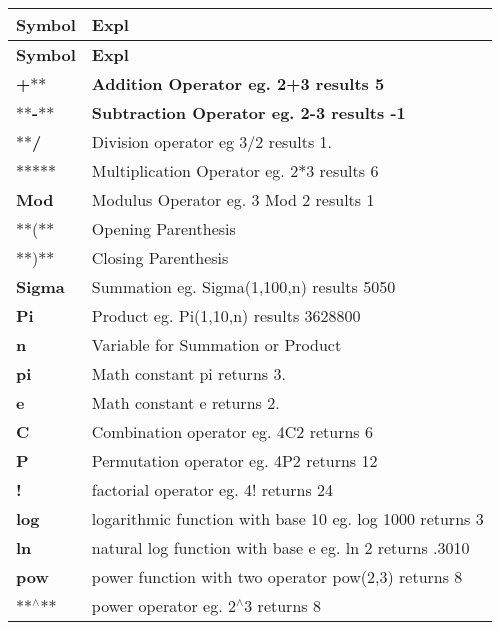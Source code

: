\tabulinesep=1mm
\begin{longtabu} spread 0pt [c]{*{2}{|X[-1]}|}
\hline
\rowcolor{\tableheadbgcolor}\textbf{ Symbol  }&\textbf{ Expl   }\\
\endfirsthead
\hline
\endfoot
\hline
\rowcolor{\tableheadbgcolor}\textbf{ Symbol  }&\textbf{ Expl   }\\
\endhead
{\bfseries +$\ast$$\ast$  }&{\bfseries  Addition Operator eg. 2+3 results 5   }\\
{\bfseries  $\ast$$\ast$-\/$\ast$$\ast$  }&{\bfseries  Subtraction Operator eg. 2-\/3 results -\/1   }\\
{\bfseries  $\ast$$\ast$/}  &Division operator eg 3/2 results 1.   \\
$\ast$$\ast$$\ast$$\ast$$\ast$  &Multiplication Operator eg. 2$\ast$3 results 6   \\
{\bfseries Mod}  &Modulus Operator eg. 3 Mod 2 results 1   \\
$\ast$$\ast$($\ast$$\ast$  &Opening Parenthesis   \\
$\ast$$\ast$)$\ast$$\ast$  &Closing Parenthesis   \\
{\bfseries Sigma}  &Summation eg. Sigma(1,100,n) results 5050   \\
{\bfseries Pi}  &Product eg. Pi(1,10,n) results 3628800   \\
{\bfseries n}  &Variable for Summation or Product   \\
{\bfseries pi}  &Math constant pi returns 3.   \\
{\bfseries e}  &Math constant e returns 2.   \\
{\bfseries C}  &Combination operator eg. 4\+C2 returns 6   \\
{\bfseries P}  &Permutation operator eg. 4\+P2 returns 12   \\
{\bfseries !}  &factorial operator eg. 4! returns 24   \\
{\bfseries log}  &logarithmic function with base 10 eg. log 1000 returns 3   \\
{\bfseries ln}  &natural log function with base e eg. ln 2 returns .3010   \\
{\bfseries pow}  &power function with two operator pow(2,3) returns 8   \\
$\ast$$\ast$$^\wedge$$\ast$$\ast$  &power operator eg. 2$^\wedge$3 returns 8   \\

\end{longtabu}

